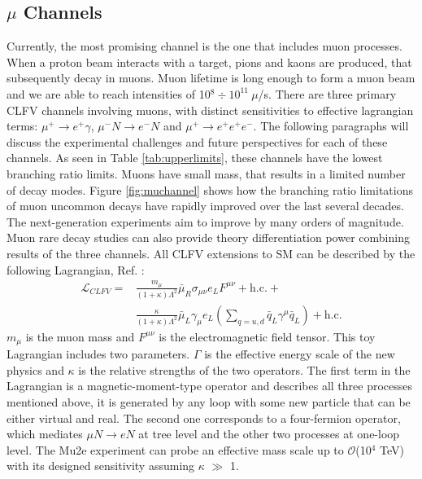 \subsection{$\mu$ Channels}
Currently, the most promising channel is the one that includes muon processes. When a proton beam interacts with a target, 
pions and kaons are produced, that subsequently decay in muons. Muon lifetime is long enough to form a muon beam and we are able to reach 
intensities of 10$^8 \div 10^{11} \  \mu$/s. There are three primary CLFV channels involving muons, with distinct sensitivities to effective lagrangian 
terms: $\mu^+ \rightarrow e^+ \gamma$, $\mu^- N \rightarrow e^- N$ and $\mu^+ \rightarrow e^+ e^+ e^-$. The following paragraphs 
will discuss the experimental challenges and future perspectives for each of these channels. As seen in Table \ref{tab:upperlimits}, 
these channels have the lowest branching ratio limits. Muons have small mass, that results in a limited number of decay modes. Figure \ref{fig:muchannel} 
shows how the branching ratio limitations of muon uncommon decays have rapidly improved over the last several decades. The next-generation 
experiments aim to improve by many orders of magnitude. Muon rare decay studies can also provide theory differentiation power 
combining results of the three channels. All CLFV extensions to SM can be described by the following Lagrangian, Ref. \cite{doi:10.1146/annurev-nucl-100809-131949}:
\begin{equation}\label{LCF}
\begin{aligned}
\mathscr{L}_{C L F V}= & \frac{m_\mu}{(1+\kappa) \Lambda^2} \bar{\mu}_R \sigma_{\mu \nu} e_L F^{\mu \nu}+\text{h.c.}+ \\
&\frac{\kappa}{(1+\kappa) \Lambda^2} \bar{\mu}_L \gamma_\mu e_L\left(\sum_{q=u, d} \bar{q}_L \gamma^\mu \bar{q}_L\right)+\text{h.c.}
\end{aligned}
\end{equation}
$m_\mu$ is the muon mass and  $F^{\mu \nu}$ is the electromagnetic field tensor. This toy Lagrangian includes two parameters.
$\Gamma$ is the effective energy scale of the new physics and $\kappa$ is the relative strengths of the two operators. The first term in the Lagrangian 
is a magnetic-moment-type operator and describes all three processes mentioned above, it is generated by any loop with some new particle that can be either virtual and real.
The second one corresponds to a four-fermion operator, which mediates $\mu N \rightarrow eN$ at tree level and the other two processes at one-loop level.
The Mu2e experiment can probe an effective mass scale up to $\mathcal{O}$(10$^4$ TeV) with its designed sensitivity assuming $\kappa$ $\gg$ 1.
